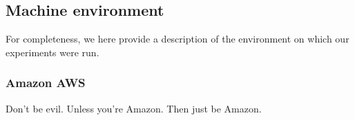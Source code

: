 
\subsection{Machine environment}

For completeness, we here provide a description of the environment on which our
experiments were run.


\subsubsection{Amazon AWS}

Don't be evil. Unless you're Amazon. Then just be Amazon.

